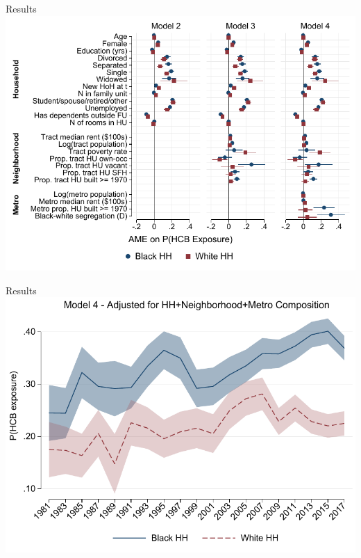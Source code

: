 \documentclass[10pt]{beamer}
\begin{document}
\begin{frame}{Results}
\vspace*{10pt}\includegraphics[width=\linewidth]{HCB_ame_ropeladder_mod_compare.pdf}
\end{frame}

\begin{frame}{Results}
\vspace*{10pt}\includegraphics[width=\linewidth]{HCB_m4_ts.pdf}
\end{frame}
\end{document}
